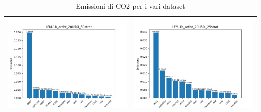 \begin{table}[H]
\begin{tabularx}{\textwidth}{|X|X|}
        \hline
        \includegraphics[width=\linewidth, trim=0 0 0 0]{images/emissions_LFM-1b_artist_20U50I_50strat.png} &
        \includegraphics[width=\linewidth, trim=0 0 0 0]{images/emissions_LFM-1b_artist_20U50I_25strat.png} \\
        \hline
    \end{tabularx}
    \caption{Emissioni di CO2 per i vari dataset}
    \label{tab:emissions_info}
\end{table}

